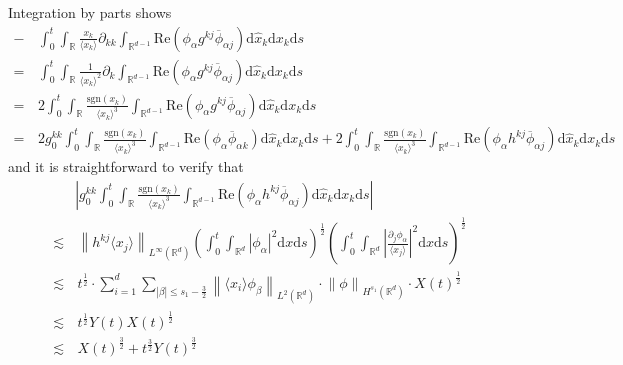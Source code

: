 \documentclass[10pt,twoside,a4paper]{article}
\numberwithin{equation}{section}\allowdisplaybreaks
\def\leq{\leqslant}
\begin{document}
Integration by parts shows
\begin{align*}  
	-&\,\int_0^t \int_{\mathbb{R}}   	\frac{x_k}{\langle x_k\rangle}   \partial_{kk} \int_{\mathbb{R}^{d-1}} \mathrm{Re}\left( \phi_{\alpha }  g^{kj} \overline{\phi}_{\alpha j}\right) \mathrm{d} \hat{x}_k   \mathrm{d} x_k \mathrm{d} s\nonumber\\
	=&\,\int_0^t \int_{\mathbb{R}}   	\frac{1}{\langle x_k\rangle^2}   \partial_{k} \int_{\mathbb{R}^{d-1}} \mathrm{Re}\left( \phi_{\alpha }  g^{kj} \overline{\phi}_{\alpha j}\right) \mathrm{d} \hat{x}_k   \mathrm{d} x_k \mathrm{d} s\\
	=&\,2\int_0^t \int_{\mathbb{R}}   	\frac{\mathrm{sgn}(x_k)}{\langle x_k\rangle^3}  \int_{\mathbb{R}^{d-1}} \mathrm{Re}\left( \phi_{\alpha }  g^{kj} \overline{\phi}_{\alpha j}\right) \mathrm{d} \hat{x}_k   \mathrm{d} x_k \mathrm{d} s\nonumber\\
	=&\, 2g^{kk}_0\int_0^t \int_{\mathbb{R}}   	\frac{\mathrm{sgn}(x_k)}{\langle x_k\rangle^3}   \int_{\mathbb{R}^{d-1}} \mathrm{Re}\left( \phi_{\alpha }  \overline{\phi}_{\alpha k}\right) \mathrm{d} \hat{x}_k   \mathrm{d} x_k \mathrm{d} s+2\int_0^t \int_{\mathbb{R}}   	\frac{\mathrm{sgn}(x_k)}{\langle x_k\rangle^3} \int_{\mathbb{R}^{d-1}} \mathrm{Re}\left( \phi_{\alpha }   h^{kj} \overline{\phi}_{\alpha j}\right) \mathrm{d} \hat{x}_k   \mathrm{d} x_k \mathrm{d} s\nonumber
\end{align*}
and it is straightforward to verify that
\begin{align*} 
	&\left|	g^{kk}_0\int_0^t \int_{\mathbb{R}}   		\frac{\mathrm{sgn}(x_k)}{\langle x_k\rangle^3} \int_{\mathbb{R}^{d-1}} \mathrm{Re}\left( \phi_{\alpha }   h^{kj} \overline{\phi}_{\alpha j}\right) \mathrm{d} \hat{x}_k   \mathrm{d} x_k \mathrm{d} s\right|\nonumber\\
	\lesssim &\, \left\|   h^{kj}  \langle x_j\rangle \right\|_{L^\infty(\mathbb{R}^d)}  \left(\int_0^t     \int_{\mathbb{R}^{d}} \left|   \phi_{\alpha }   \right|^2  \mathrm{d} x \mathrm{d} s\right)^{\frac 12}   \left(\int_0^t     \int_{\mathbb{R}^{d}} \left|\frac{\partial_j \phi_{\alpha }  } {\langle x_j\rangle}\right|^2  \mathrm{d} x \mathrm{d} s\right)^{\frac 12}\\
		\lesssim &\,t^{\frac12}\cdot\sum_{i=1}^d\sum_{|\beta| \leq s_1-\frac 32}\left\| \langle x_i\rangle \phi_{\beta}\right\|_{L^2(\mathbb{R}^d)} \cdot \left\|     \phi  \right\|_{H^{s_1}(\mathbb{R}^d)} \cdot X(t)^{\frac 12} \\
		\lesssim &\, t^{\frac12}Y(t) X(t)^{\frac 12} \\
		\lesssim &\, X(t)^{\frac 32}+t^{\frac32}Y(t)^{\frac 32}
\end{align*}
\end{document}
